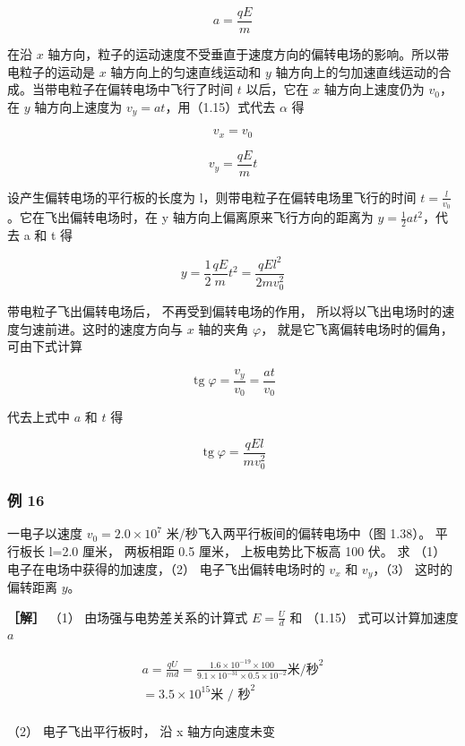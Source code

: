 \[
a = \frac{q E}{m} \tag{1.15}
\]

在沿 \(x\)
轴方向，粒子的运动速度不受垂直于速度方向的偏转电场的影响。所以带电粒子的运动是
\(x\) 轴方向上的匀速直线运动和 \(y\)
轴方向上的匀加速直线运动的合成。当带电粒子在偏转电场中飞行了时间 \(t\)
以后，它在 \(x\) 轴方向上速度仍为 \(v_{0}\)，在 \(y\) 轴方向上速度为
\(v_{y} = at\)，用（1.15）式代去 \(\alpha\) 得

\[
v_{x} = v_{0} \tag{1.16}
\]

\[
v_{y} = \frac{q E}{m} t \tag{1.17}
\]

设产生偏转电场的平行板的长度为 l，则带电粒子在偏转电场里飞行的时间
\(t=\frac{l}{v_{0}}\)。它在飞出偏转电场时，在 y
轴方向上偏离原来飞行方向的距离为 \(y=\frac{1}{2}at^{2}\)，代去 a 和 t 得

\[
y = \frac{1}{2} \frac{q E}{m} t^{2} = \frac{q E l^{2}}{2 m v_{0}^{2}} \tag{1.18}
\]

带电粒子飞出偏转电场后， 不再受到偏转电场的作用，
所以将以飞出电场时的速度匀速前进。这时的速度方向与 \(x\) 轴的夹角
\(\varphi\)， 就是它飞离偏转电场时的偏角， 可由下式计算

\[
\operatorname{tg} \varphi = \frac{v_{y}}{v_{0}} = \frac{a t}{v_{0}} \tag{1.19}
\]

代去上式中 \(a\) 和 \(t\) 得

\[
\operatorname{tg} \varphi = \frac{q E l}{m v_{0}^{2}} \tag{1.20}
\]

\subsubsection{例 16}\label{ux4f8b-16}

一电子以速度 \(v_{0}=2.0\times10^{7}\)
米/秒飞入两平行板间的偏转电场中（图 1.38）。 平行板长 l=2.0 厘米，
两板相距 0.5 厘米， 上板电势比下板高 100 伏。 求 （1）
电子在电场中获得的加速度，（2） 电子飞出偏转电场时的 \(v_x\) 和
\(v_y\)，（3） 这时的偏转距离 \(y\)。

\textbf{［解］} （1） 由场强与电势差关系的计算式 \(E=\frac{U}{d}\) 和
（1.15） 式可以计算加速度 \(a\)

\[
\begin{array}{l} a = \frac{q U}{m d} = \frac{1.6 \times 10^{- 19} \times 100}{9.1 \times 10^{- 31} \times 0.5 \times 10^{- 2}} \text{米/秒}^{2} \\ = 3.5 \times 10^{15} \text{米 / 秒}^{2} \\ \end{array}
\]

（2） 电子飞出平行板时， 沿 x 轴方向速度未变

